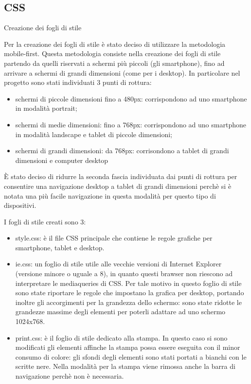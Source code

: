 \subsection{CSS}
Creazione dei fogli di stile

Per la creazione dei fogli di stile è stato deciso di utilizzare la metodologia mobile-first.
Questa metodologia consiste nella creazione dei fogli di stile partendo da quelli riservati a schermi più piccoli (gli smartphone), fino ad arrivare a schermi di grandi dimensioni (come per i desktop).
In particolare nel progetto sono stati individuati 3 punti di rottura:
\begin{itemize}

    \item schermi di piccole dimensioni fino a 480px: corrispondono ad uno smartphone in modalità portrait;
    \item schermi di medie dimensioni: fino a 768px: corrispondono ad uno smartphone in modalità landscape e tablet di piccole dimensioni;
    \item schermi di grandi dimensioni: da 768px: corrisondono a tablet di grandi dimensioni e computer desktop

\end{itemize}

\`E stato deciso di ridurre la seconda fascia individuata dai punti di rottura per consentire una navigazione desktop a tablet di grandi dimensioni perchè si è notata una più facile navigazione in questa modalità per questo tipo di dispositivi.

I fogli di stile creati sono 3:
\begin{itemize}

    \item style.css: è il file CSS principale che contiene le regole grafiche per smartphone, tablet e desktop.
    \item ie.css:  un foglio di stile utile alle vecchie versioni di Internet Explorer (versione minore o uguale a 8), in quanto questi brawser non riescono ad interpretare le mediaqueries di CSS. Per tale motivo in questo foglio di stile sono state riportare le regole che impostano la grafica per desktop, portando inoltre gli accorgimenti per la grandezza dello schermo: sono state ridotte le grandezze massime degli elementi per poterli adattare ad uno schermo 1024x768.
    \item print.css: è il foglio di stile dedicato alla stampa. In questo caso si sono modificati gli elementi affinche la stampa possa essere eseguita con il minor consumo di colore: gli sfondi degli elementi sono stati portati a bianchi con le scritte nere. Nella modalità per la stampa viene rimossa anche la barra di navigazione perchè non è necessaria.

\end{itemize}


